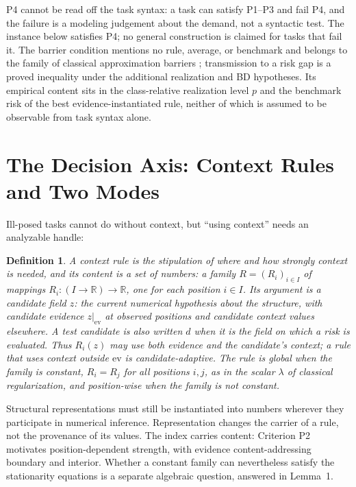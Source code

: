 \documentclass[twoside,11pt]{article}
\newtheorem{defn}{Definition}
\newcommand{\ev}{\mathrm{ev}}
\begin{document}
P4 cannot be read off the task syntax: a task can satisfy P1--P3 and fail P4, and the failure is a modeling judgement about the demand, not a syntactic test. The instance below satisfies P4; no general construction is claimed for tasks that fail it. The barrier condition mentions no rule, average, or benchmark and belongs to the family of classical approximation barriers \citep{kolmogorov1936,pinkus1985}; transmission to a risk gap is a proved inequality under the additional realization and BD hypotheses. Its empirical content sits in the class-relative realization level $p$ and the benchmark risk of the best evidence-instantiated rule, neither of which is assumed to be observable from task syntax alone.

\section{The Decision Axis: Context Rules and Two Modes}
\label{ch:axis}%

Ill-posed tasks cannot do without context, but ``using context'' needs an analyzable handle:

\begin{defn}
A \emph{context rule} is the stipulation of where and how strongly context is needed, and its content is a set of numbers: a family $R = (R_i)_{i \in I}$ of mappings $R_i : (I \to \mathbb{R}) \to \mathbb{R}$, one for each position $i \in I$. Its argument is a \emph{candidate field} $z$: the current numerical hypothesis about the structure, with candidate evidence $z|_{\ev}$ at observed positions and candidate context values elsewhere. A test candidate is also written $d$ when it is the field on which a risk is evaluated. Thus $R_i(z)$ may use both evidence and the candidate's context; a rule that uses context outside $\ev$ is \emph{candidate-adaptive}. The rule is \emph{global} when the family is constant, $R_i = R_j$ for all positions $i, j$, as in the scalar $\lambda$ of classical regularization, and \emph{position-wise} when the family is not constant.
\end{defn}

Structural representations must still be instantiated into numbers wherever they participate in numerical inference. Representation changes the carrier of a rule, not the provenance of its values. The index carries content: Criterion P2 motivates position-dependent strength, with evidence content-addressing boundary and interior. Whether a constant family can nevertheless satisfy the stationarity equations is a separate algebraic question, answered in Lemma~1.
\end{document}
